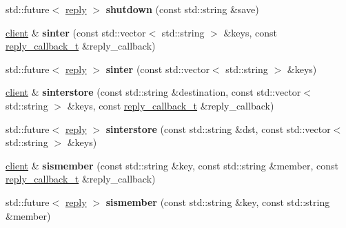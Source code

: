\begin{DoxyCompactItemize}
\item 
\mbox{\label{classcpp__redis_1_1client_a8587aeb1044e85ae580cd9661ea826dc}} 
std\+::future$<$ \hyperlink{classcpp__redis_1_1reply}{reply} $>$ {\bfseries shutdown} (const std\+::string \&save)
\item 
\mbox{\label{classcpp__redis_1_1client_a67a96ae85449a4dfa6e8976666562be1}} 
\hyperlink{classcpp__redis_1_1client}{client} \& {\bfseries sinter} (const std\+::vector$<$ std\+::string $>$ \&keys, const \hyperlink{classcpp__redis_1_1client_a061a1140d36d2eaeda82b09a0bb3f9f2}{reply\+\_\+callback\+\_\+t} \&reply\+\_\+callback)
\item 
\mbox{\label{classcpp__redis_1_1client_a069df07b6b3f18f5b2c215c67161c115}} 
std\+::future$<$ \hyperlink{classcpp__redis_1_1reply}{reply} $>$ {\bfseries sinter} (const std\+::vector$<$ std\+::string $>$ \&keys)
\item 
\mbox{\label{classcpp__redis_1_1client_a55f1722f17eaaa255196851efb0bdb93}} 
\hyperlink{classcpp__redis_1_1client}{client} \& {\bfseries sinterstore} (const std\+::string \&destination, const std\+::vector$<$ std\+::string $>$ \&keys, const \hyperlink{classcpp__redis_1_1client_a061a1140d36d2eaeda82b09a0bb3f9f2}{reply\+\_\+callback\+\_\+t} \&reply\+\_\+callback)
\item 
\mbox{\label{classcpp__redis_1_1client_aa105a26578624af221f16675c0fbfc55}} 
std\+::future$<$ \hyperlink{classcpp__redis_1_1reply}{reply} $>$ {\bfseries sinterstore} (const std\+::string \&dst, const std\+::vector$<$ std\+::string $>$ \&keys)
\item 
\mbox{\label{classcpp__redis_1_1client_a369fb068437dfb3f63091d031174cc19}} 
\hyperlink{classcpp__redis_1_1client}{client} \& {\bfseries sismember} (const std\+::string \&key, const std\+::string \&member, const \hyperlink{classcpp__redis_1_1client_a061a1140d36d2eaeda82b09a0bb3f9f2}{reply\+\_\+callback\+\_\+t} \&reply\+\_\+callback)
\item 
\mbox{\label{classcpp__redis_1_1client_af4ba6bfa37b81759324c726ef77acdbc}} 
std\+::future$<$ \hyperlink{classcpp__redis_1_1reply}{reply} $>$ {\bfseries sismember} (const std\+::string \&key, const std\+::string \&member)

\end{DoxyCompactItemize}
